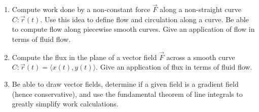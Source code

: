 
\begin{enumerate}
\item Compute work done by a non-constant force $\vec F$ along a
  non-straight curve $C\colon\vec r(t)$. Use this idea to define flow and
  circulation along a curve.  Be able to compute flow along piecewise
  smooth curves. Give an application of flow in terms of fluid flow.
\item Compute the flux in the plane of a vector field $\vec F$ across
  a smooth curve $C\colon\vec r(t) = \langle x(t),y(t)\rangle$.  Give an
  application of flux in terms of fluid flow.
\item Be able to draw vector fields, determine if a given field is a
  gradient field (hence conservative), and use the fundamental theorem
  of line integrals to greatly simplify work calculations.
\end{enumerate}

